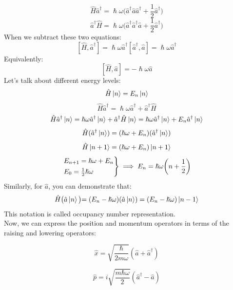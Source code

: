 \documentclass{article}
\begin{document}
$$\hat{H}\hat{a}^{\dag} = \hslash \omega \biggl( \hat{a}^{\dag}\hat{a}\hat{a}^{\dag}+ \frac{1}{2}\hat{a}^{\dag} \biggl) $$
$$\hat{a}^{\dag} \hat{H} =  \hslash \omega \biggl( \hat{a}^{\dag}\hat{a}^{\dag}\hat{a}+ \frac{1}{2}\hat{a}^{\dag} \biggl)$$
When we subtract these two equations:
$$ [\hat{H}, \hat{a}^{\dag}] = \hslash\omega\hat{a}^{\dag}[\hat{a}^{\dag},\hat{a}] = \hslash\omega\hat{a}^{\dag} $$
Equivalently:
$$[\hat{H}, \hat{a}] = -\hslash\omega\hat{a}$$
Let's talk about different energy levels:
$$\hat{H}\ket{n} = E_n \ket{n}$$
$$ \hat{H}\hat{a}^{ \dag} = \hslash \omega \hat{a}^{\dag} + \hat{a}^{\dag}\hat{H}$$
$$\hat{H}\hat{a}^{\dag} \ket{n} = \hslash \omega \hat{a}^{\dag} \ket{n} + \hat{a}^{\dag}\hat{H}\ket{n} = \hslash\omega\hat{a}^{\dag}\ket{n} + E_n \hat{a}^{\dag}\ket{n}$$
$$\hat{H}(\hat{a}^{\dag}\ket{n}) = (\hslash\omega+E_n)(\hat{a}^{\dag}\ket{n})$$
$$\hat{H}\ket{n+1} = (\hslash\omega + E_n ) \ket{n+1}$$
\begin{equation*}
\begin{rcases}
  E_{n+1} = \hslash \omega + E_n \\
  E_0= \frac{1}{2} \hslash \omega \\
\end{rcases}
\implies E_n = \hslash \omega \biggl( n + \frac{1}{2} \biggl)
\end{equation*} 
Similarly, for $\hat{a}$, you can demonstrate that:
$$\hat{H}\bigl( \hat{a}\ket{n} \bigl) = (E_n -\hslash \omega ) (\hat{a}\ket{n}) = (E_n -\hslash \omega) \ket{n-1} $$
This notation is called occupancy number representation.\\
Now, we can express the position and momentum operators in terms of the raising and lowering operators:

$$
\hat{x} = \sqrt{\frac{\hbar}{2m\omega}}(\hat{a} + \hat{a}^\dagger)
$$

$$
\hat{p} = i\sqrt{\frac{m\hbar\omega}{2}}(\hat{a}^\dagger - \hat{a})
$$
\end{document}
